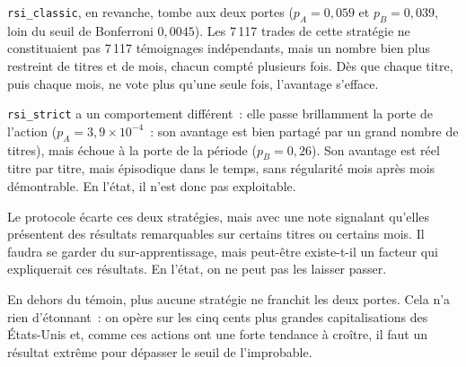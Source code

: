 \texttt{rsi\_classic}, en revanche, tombe aux deux portes
($p_A = 0{,}059$ et $p_B = 0{,}039$, loin du seuil de Bonferroni
$0{,}0045$). Les 7\,117 trades de cette stratégie ne
constituaient pas 7\,117 témoignages indépendants, mais un nombre bien plus
restreint de titres et de mois, chacun compté plusieurs fois. Dès que
chaque titre, puis chaque mois, ne vote plus qu'une seule fois, l'avantage
s'efface.

\texttt{rsi\_strict} a un comportement différent~: elle passe brillamment la
porte de l'action ($p_A = 3{,}9\times10^{-4}$~: son avantage est bien partagé
par un grand nombre de titres), mais échoue à la porte de la période
($p_B = 0{,}26$). Son avantage est réel titre par titre, mais
épisodique dans le temps, sans régularité mois après mois
démontrable. En l'état, il n'est donc pas exploitable.

Le protocole écarte ces deux stratégies, mais avec une note signalant qu'elles
présentent des résultats remarquables sur certains titres ou certains mois.
Il faudra se garder du sur-apprentissage, mais peut-être existe-t-il un
facteur qui expliquerait ces résultats. En l'état, on ne peut pas les laisser
passer.

En dehors du témoin, plus aucune stratégie ne franchit les deux portes. Cela
n'a rien d'étonnant~: on opère sur les cinq cents plus grandes capitalisations
des États-Unis et, comme ces actions ont une forte tendance à croître, il faut
un résultat extrême pour dépasser le seuil de l'improbable.



